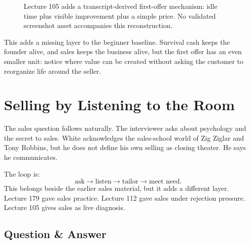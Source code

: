 \documentclass[11pt,oneside]{book}
\begin{document}
\begin{figure}
\centering
{}
\caption{Lecture 105 adds a transcript-derived first-offer mechanism: idle time plus visible improvement plus a simple price. No validated screenshot asset accompanies this reconstruction.}
\end{figure}

This adds a missing layer to the beginner baseline. Survival cash keeps the founder alive, and sales keeps the business alive, but the first offer has an even smaller unit: notice where value can be created without asking the customer to reorganize life around the seller.

\section{Selling by Listening to the Room}

The sales question follows naturally. The interviewer asks about psychology and the secret to sales. White acknowledges the sales-school world of Zig Ziglar and Tony Robbins, but he does not define his own selling as closing theater. He says he communicates.

The loop is:
\[
\text{ask}
\longrightarrow
\text{listen}
\longrightarrow
\text{tailor}
\longrightarrow
\text{meet need}.
\]
This belongs beside the earlier sales material, but it adds a different layer. Lecture 179 gave sales practice. Lecture 112 gave sales under rejection pressure. Lecture 105 gives sales as live diagnosis.

\subsection{Question \& Answer}
\end{document}
